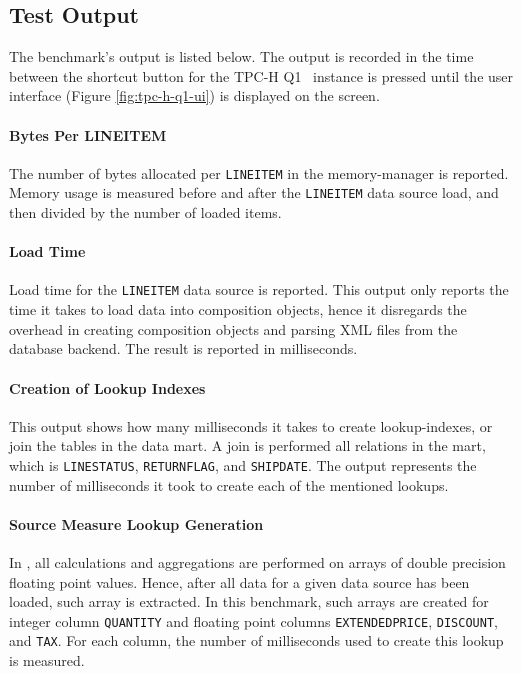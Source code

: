 \subsection{Test Output}
\label{sub:Test Output}
The benchmark's output is listed below. The output is recorded in the time between the shortcut button for the TPC-H Q1 \gd~instance is pressed until the user interface (Figure \ref{fig:tpc-h-q1-ui}) is displayed on the screen.

\paragraph{Bytes Per LINEITEM}
The number of bytes allocated per \texttt{LINEITEM} in the memory-manager is reported. Memory usage is measured before and after the \texttt{LINEITEM} data source load, and then divided by the number of loaded items.

\paragraph{Load Time}
\label{par:Load Time}
Load time for the \texttt{LINEITEM} data source is reported. This output only reports the time it takes to load data into composition objects, hence it disregards the overhead in creating composition objects and parsing XML files from the database backend. The result is reported in milliseconds.

\paragraph{Creation of Lookup Indexes}
This output shows how many milliseconds it takes to create lookup-indexes, or join the tables in the data mart. A join is performed all relations in the mart, which is \texttt{LINESTATUS}, \texttt{RETURNFLAG}, and \texttt{SHIPDATE}. The output represents the number of milliseconds it took to create each of the mentioned lookups.

\paragraph{Source Measure Lookup Generation}
In \gd, all calculations and aggregations are performed on arrays of double precision floating point values. Hence, after all data for a given data source has been loaded, such array is extracted. In this benchmark, such arrays are created for integer column \texttt{QUANTITY} and floating point columns \texttt{EXTENDEDPRICE}, \texttt{DISCOUNT}, and \texttt{TAX}. For each column, the number of milliseconds used to create this lookup is measured.

